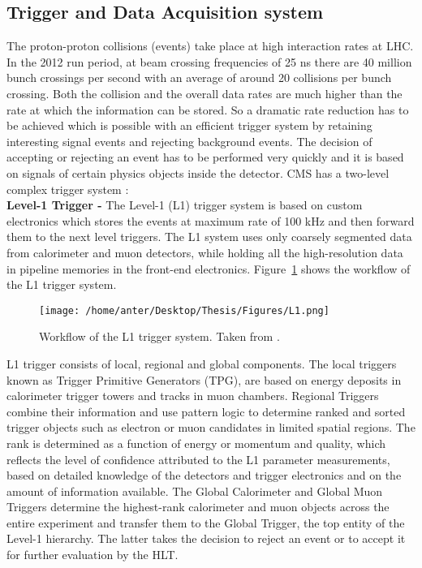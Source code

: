 \subsection{Trigger and Data Acquisition system}
The proton-proton collisions (events) take place at high interaction rates at LHC. In the 2012 run period, at beam crossing frequencies of 25 ns there are 40 million bunch crossings per second with an average of around 20 collisions per bunch crossing. Both the collision and the overall data rates are much higher than the rate at which the information can be stored. So a dramatic rate reduction has to be achieved which is possible with an efficient trigger system by retaining interesting signal events and rejecting background events. The decision of accepting or rejecting an event has to be performed very quickly and it is based on signals of certain physics objects inside the detector.
CMS has a two-level complex trigger system : \\\newline
{\bf Level-1 Trigger -} The Level-1 (L1) trigger system is based on custom electronics which stores the events at maximum rate of 100 kHz and then forward them to the next level triggers. The L1 system uses only coarsely segmented data from calorimeter and muon detectors, while holding all the high-resolution data in pipeline memories in the front-end electronics. Figure~\ref{fig:L1} shows the workflow of the L1 trigger system. 
\begin{figure}[!h]
\begin{center}
\vspace*{3mm} 
\hspace*{-5mm}
\texttt{[image: /home/anter/Desktop/Thesis/Figures/L1.png]}\\
\vspace*{4mm}
\caption{Workflow of the L1 trigger system. Taken from \cite{Chatrchyan:2008aa}.}
\label{fig:L1}
\end{center}
\end{figure}
L1 trigger consists of local, regional and global components. The local triggers known as Trigger Primitive Generators (TPG), are based on energy deposits in calorimeter trigger towers and tracks in muon chambers. Regional Triggers combine their information and use pattern logic to determine ranked and sorted trigger objects such as electron or muon candidates in limited spatial regions. The rank is determined as a function of energy or momentum and quality, which reflects the level of confidence attributed to the L1 parameter measurements, based on detailed knowledge of the detectors and trigger electronics and on the amount of information available. The Global Calorimeter and Global Muon Triggers determine the highest-rank calorimeter and muon objects across the entire experiment and transfer them to the Global Trigger, the top entity of the Level-1 hierarchy. The latter takes the decision to reject an event or to accept it for further evaluation by the HLT. \\\newline
